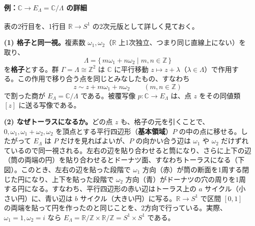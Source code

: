 \documentclass[uplatex, dvipdfmx, book]{jsbook}
\begin{document}
\paragraph{例：$\mathbb{C} \to E_\Lambda = \mathbb{C}/\Lambda$ の詳細}
表の2行目を、1行目 $\mathbb{R} \to S^1$ の2次元版として詳しく見ておく。

\textbf{(1) 格子と同一視。}複素数 $\omega_1, \omega_2$（$\mathbb{R}$ 上1次独立、つまり同じ直線上にない）を取り、
\begin{equation*}
    \Lambda = \{\, m\omega_1 + n\omega_2 \mid m, n \in \mathbb{Z} \,\}
\end{equation*}
を\textbf{格子}とする。群 $\Gamma = \Lambda \cong \mathbb{Z}^2$ は $\mathbb{C}$ に平行移動 $z \mapsto z + \lambda$（$\lambda \in \Lambda$）で作用する。この作用で移り合う点を同じとみなしたもの、すなわち
\begin{equation*}
    z \sim z + m\omega_1 + n\omega_2 \qquad (m, n \in \mathbb{Z})
\end{equation*}
で割った商が $E_\Lambda = \mathbb{C}/\Lambda$ である。被覆写像 $p: \mathbb{C} \to E_\Lambda$ は、点 $z$ をその同値類 $[z]$ に送る写像である。

\textbf{(2) なぜトーラスになるか。}どの点 $z$ も、格子の元を引くことで、$0, \omega_1, \omega_1 + \omega_2, \omega_2$ を頂点とする平行四辺形（\textbf{基本領域}）$P$ の中の点に移せる。したがって $E_\Lambda$ は $P$ だけを見ればよいが、$P$ の向かい合う辺は $\omega_1$ や $\omega_2$ だけずれているので同一視される。左右の辺を貼り合わせると筒になり、さらに上下の辺（筒の両端の円）を貼り合わせるとドーナツ面、すなわちトーラスになる（下図）。このとき、左右の辺を貼った段階で $\omega_1$ 方向（赤）が筒の断面を1周する閉じた円になり、上下を貼った段階で $\omega_2$ 方向（青）がドーナツの穴の周りを1周する円になる。すなわち、平行四辺形の赤い辺はトーラス上の $a$ サイクル（小さい円）に、青い辺は $b$ サイクル（大きい円）に写る。$\mathbb{R} \to S^1$ で区間 $[0,1]$ の両端を貼って円を作ったのと同じことを、2方向で行っている。実際、$\omega_1 = 1, \omega_2 = i$ なら $E_\Lambda = \mathbb{R}/\mathbb{Z} \times \mathbb{R}/\mathbb{Z} = S^1 \times S^1$ である。
\end{document}
